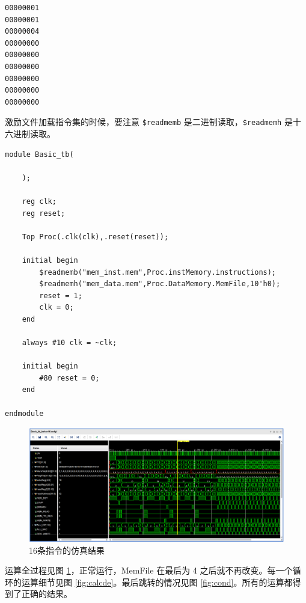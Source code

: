 \documentclass[a4paper,UTF8]{ctexart}
\providecommand{\code}[2]{}
\begin{document}
    \code{simple.asm}{}
    \begin{lstlisting}[caption=mem\_data.mem]
00000001
00000001
00000004
00000000
00000000
00000000
00000000
00000000
00000000
    \end{lstlisting}

激励文件加载指令集的时候，要注意 \verb"$readmemb" 是二进制读取，\verb"$readmemh" 是十六进制读取。

\begin{lstlisting}[caption=Basic\_tb.v]
module Basic_tb(

    );

    reg clk;
    reg reset;

    Top Proc(.clk(clk),.reset(reset));

    initial begin
        $readmemb("mem_inst.mem",Proc.instMemory.instructions);
        $readmemh("mem_data.mem",Proc.DataMemory.MemFile,10'h0);
        reset = 1;
        clk = 0;
    end

    always #10 clk = ~clk;

    initial begin
        #80 reset = 0;
    end

endmodule
\end{lstlisting}

\begin{figure}[H]
    \centering
    \includegraphics[width=\textwidth]{figure2.png}
    \caption{16条指令的仿真结果}
    \label{fig:16}
\end{figure}

运算全过程见图 \ref{fig:16}，正常运行，MemFile 在最后为 4 之后就不再改变。每一个循环的运算细节见图 \ref{fig:calcde}。最后跳转的情况见图 \ref{fig:cond}。所有的运算都得到了正确的结果。
\end{document}
